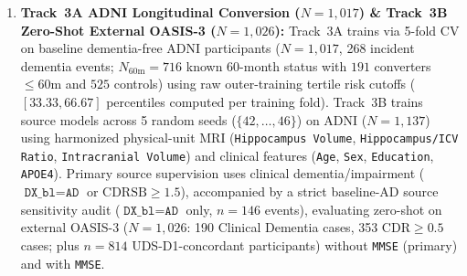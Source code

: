 \documentclass[10pt,twocolumn]{article}
\begin{document}
\begin{enumerate}[leftmargin=1.4em,itemsep=1pt,topsep=2pt]
    A$\beta^-$, 51 A$\beta^+$), Unmeasured Baseline eGFR ($n=194$), and exploratory Baseline
    Low eGFR ($<60\text{ mL/min/1.73m}^2$, $n=22$: 6 A$\beta^-$, 16 A$\beta^+$).
    One baseline measurement cannot establish the $\ge 3$-month KDIGO chronicity criterion
    for a clinical CKD diagnosis or exclude albuminuria. Real-world biomarker discordance
    ($n=198$ discordant vs.\ $n=914$ concordant across $N=1,112$ deduplicated ADNI plasma
    participants) is audited using raw outer-training 80th/85th-percentile referral cutoffs
    in Supplementary Table~\ref{tab:external_ckd}. Supplementary
    Table~\ref{tab:matched_coverage} instead uses a nested
    outer-training mid-rank empirical cumulative distribution function (ECDF):
    \[
    \widehat{F}_f(s) = \frac{1}{2\,|\mathcal{D}_f^{\text{cal}}|}
    \sum_{j \in \mathcal{D}_f^{\text{cal}}}
    \Big[\mathbb{I}(s_{f,j} < s) + \mathbb{I}(s_{f,j} \le s)\Big].
    \]
    Here $\mathcal{D}_f^{\text{cal}}$ contains fold-$f$ outer-training discordant in-sample
    predictions, with discordance defined using fold-$f$ training medians; fewer than five
    discordant cases trigger a fallback to the full training fold. Percentiles are mapped
    out-of-fold to held-out Cohort~1 and non-overlapping Cohort~2 discordant patients, then
    sorted across the pooled $n=198$ with raw-score tie-breaking.
    \item \textbf{Track~3A ADNI Longitudinal Conversion ($N=1,017$) \& Track~3B Zero-Shot
    External OASIS-3 ($N=1,026$):} Track~3A trains via 5-fold CV on baseline dementia-free ADNI
    participants ($N=1,017$, 268 incident dementia events; $N_{60\text{m}}=716$ known 60-month
    status with $191$ converters $\le 60$m and $525$ controls) using raw outer-training tertile
    risk cutoffs ($[33.33, 66.67]$ percentiles computed per training fold). Track~3B trains
    source models across 5 random seeds ($\{42,\dots,46\}$) on ADNI ($N=1,137$) using
    harmonized physical-unit MRI (\texttt{Hippocampus Volume}, \texttt{Hippocampus/ICV Ratio},
    \texttt{Intracranial Volume}) and clinical features (\texttt{Age}, \texttt{Sex},
    \texttt{Education}, \texttt{APOE4}). Primary source supervision uses clinical
    dementia/impairment ($\texttt{DX\_bl}=\texttt{AD}$ or $\text{CDRSB}\ge 1.5$), accompanied
    by a strict baseline-AD source sensitivity audit ($\texttt{DX\_bl}=\texttt{AD}$ only,
    $n=146$ events), evaluating zero-shot on external OASIS-3 ($N=1,026$: 190 Clinical Dementia
    cases, 353 $\text{CDR}\ge 0.5$ cases; plus $n=814$ UDS-D1-concordant participants)
    \cite{lamontagne2019oasis} without \texttt{MMSE} (primary) and with \texttt{MMSE}.

\end{enumerate}
\end{document}
